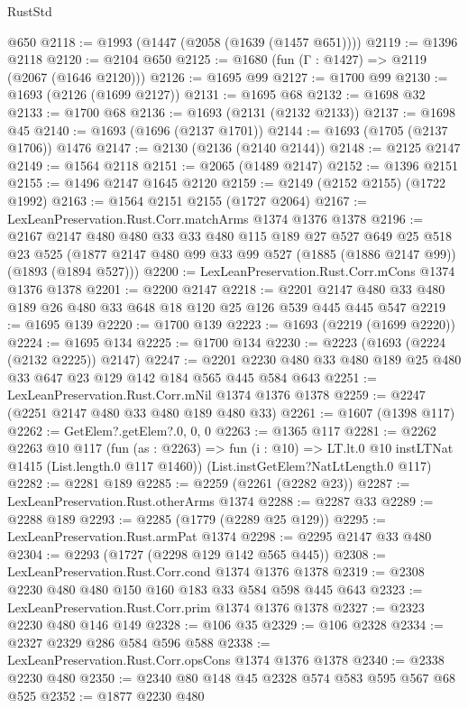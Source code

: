 \begin{lexlean}{RustStd}
\begin{coremodule}
    @650
@2118 := @1993 (@1447 (@2058 (@1639 (@1457 @651))))
@2119 := @1396 @2118
@2120 := @2104 @650
@2125 := @1680 (fun (Γ : @1427) => @2119 (@2067 (@1646 @2120)))
@2126 := @1695 @99
@2127 := @1700 @99
@2130 := @1693 (@2126 (@1699 @2127))
@2131 := @1695 @68
@2132 := @1698 @32
@2133 := @1700 @68
@2136 := @1693 (@2131 (@2132 @2133))
@2137 := @1698 @45
@2140 := @1693 (@1696 (@2137 @1701))
@2144 := @1693 (@1705 (@2137 @1706)) @1476
@2147 := @2130 (@2136 (@2140 @2144))
@2148 := @2125 @2147
@2149 := @1564 @2118
@2151 := @2065 (@1489 @2147)
@2152 := @1396 @2151
@2155 := @1496 @2147 @1645 @2120
@2159 := @2149 (@2152 @2155) (@1722 @1992)
@2163 := @1564 @2151 @2155 (@1727 @2064)
@2167 := LexLeanPreservation.Rust.Corr.matchArms @1374 @1376 @1378
@2196 := @2167
    @2147
    @480
    @480
    @33
    @33
    @480
    @115
    @189
    @27
    @527
    @649
    @25
    @518
    @23
    @525
    (@1877 @2147 @480 @99 @33 @99 @527 (@1885 (@1886 @2147 @99)) (@1893 (@1894 @527)))
@2200 := LexLeanPreservation.Rust.Corr.mCons @1374 @1376 @1378
@2201 := @2200 @2147
@2218 := @2201 @2147 @480 @33 @480 @189 @26 @480 @33 @648 @18 @120 @25 @126 @539 @445 @445 @547
@2219 := @1695 @139
@2220 := @1700 @139
@2223 := @1693 (@2219 (@1699 @2220))
@2224 := @1695 @134
@2225 := @1700 @134
@2230 := @2223 (@1693 (@2224 (@2132 @2225)) @2147)
@2247 := @2201 @2230 @480 @33 @480 @189 @25 @480 @33 @647 @23 @129 @142 @184 @565 @445 @584 @643
@2251 := LexLeanPreservation.Rust.Corr.mNil @1374 @1376 @1378
@2259 := @2247 (@2251 @2147 @480 @33 @480 @189 @480 @33)
@2261 := @1607 (@1398 @117)
@2262 := GetElem?.getElem?.{0, 0, 0}
@2263 := @1365 @117
@2281 := @2262
    @2263
    @10
    @117
    (fun (as : @2263) =>
    fun (i : @10) => LT.lt.{0} @10 instLTNat @1415 (List.length.{0} @117 @1460))
    (List.instGetElem?NatLtLength.{0} @117)
@2282 := @2281 @189
@2285 := @2259 (@2261 (@2282 @23))
@2287 := LexLeanPreservation.Rust.otherArms @1374
@2288 := @2287 @33
@2289 := @2288 @189
@2293 := @2285 (@1779 (@2289 @25 @129))
@2295 := LexLeanPreservation.Rust.armPat @1374
@2298 := @2295 @2147 @33 @480
@2304 := @2293 (@1727 (@2298 @129 @142 @565 @445))
@2308 := LexLeanPreservation.Rust.Corr.cond @1374 @1376 @1378
@2319 := @2308 @2230 @480 @480 @150 @160 @183 @33 @584 @598 @445 @643
@2323 := LexLeanPreservation.Rust.Corr.prim @1374 @1376 @1378
@2327 := @2323 @2230 @480 @146 @149
@2328 := @106 @35
@2329 := @106 @2328
@2334 := @2327 @2329 @286 @584 @596 @588
@2338 := LexLeanPreservation.Rust.Corr.opsCons @1374 @1376 @1378
@2340 := @2338 @2230 @480
@2350 := @2340 @80 @148 @45 @2328 @574 @583 @595 @567 @68 @525
@2352 := @1877 @2230 @480

\end{coremodule}
\end{lexlean}
